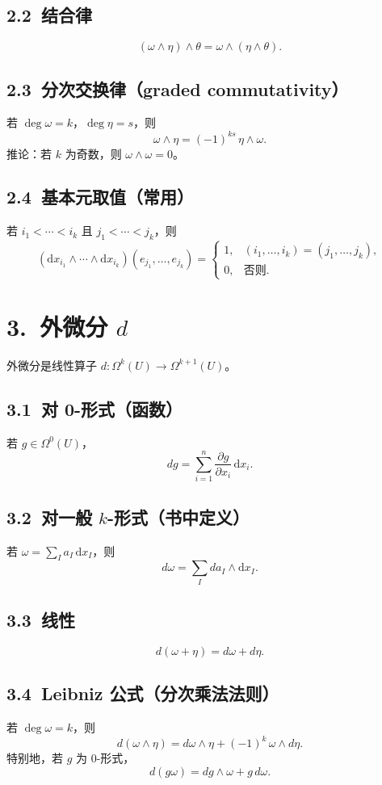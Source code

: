 \documentclass[11pt,a4paper]{article}
\newcommand{\Om}{\Omega}
\newcommand{\dx}{\mathrm{d}x}
\begin{document}
\subsection*{2.2\ 结合律}
\[
(\omega\wedge\eta)\wedge\theta=\omega\wedge(\eta\wedge\theta).
\]

\subsection*{2.3\ 分次交换律（graded commutativity）}
若 $\deg\omega=k$，$\deg\eta=s$，则
\[
\omega\wedge\eta = (-1)^{ks}\,\eta\wedge\omega.
\]
推论：若 $k$ 为奇数，则 $\omega\wedge\omega=0$。

\subsection*{2.4\ 基本元取值（常用）}
若 $i_1<\cdots<i_k$ 且 $j_1<\cdots<j_k$，则
\[
(\dx_{i_1}\wedge\cdots\wedge \dx_{i_k})(e_{j_1},\dots,e_{j_k})
=
\begin{cases}
1,& (i_1,\dots,i_k)=(j_1,\dots,j_k),\\
0,& \text{否则}.
\end{cases}
\]

\section*{3.\ 外微分 $d$}
外微分是线性算子 $d:\Om^k(U)\to \Om^{k+1}(U)$。

\subsection*{3.1\ 对 0-形式（函数）}
若 $g\in\Om^0(U)$，
\[
dg=\sum_{i=1}^n \frac{\partial g}{\partial x_i}\,\dx_i.
\]

\subsection*{3.2\ 对一般 $k$-形式（书中定义）}
若 $\omega=\sum_I a_I\,\dx_I$，则
\[
d\omega=\sum_I da_I\wedge \dx_I.
\]

\subsection*{3.3\ 线性}
\[
d(\omega+\eta)=d\omega+d\eta.
\]

\subsection*{3.4\ Leibniz 公式（分次乘法法则）}
若 $\deg\omega=k$，则
\[
d(\omega\wedge\eta)=d\omega\wedge\eta+(-1)^k\,\omega\wedge d\eta.
\]
特别地，若 $g$ 为 0-形式，
\[
d(g\omega)=dg\wedge\omega+g\,d\omega.
\]
\end{document}
